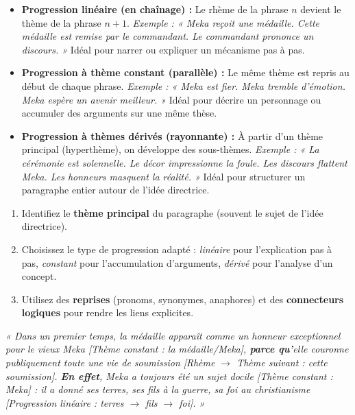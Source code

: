 \documentclass[11pt]{article}
\begin{document}
\begin{definition}
\begin{itemize}
\item \textbf{Progression linéaire (en chaînage) :} Le rhème de la phrase $n$ devient le thème de la phrase $n+1$. \emph{Exemple : « Meka reçoit une médaille. Cette médaille est remise par le commandant. Le commandant prononce un discours. »} Idéal pour narrer ou expliquer un mécanisme pas à pas.
\item \textbf{Progression à thème constant (parallèle) :} Le même thème est repris au début de chaque phrase. \emph{Exemple : « Meka est fier. Meka tremble d'émotion. Meka espère un avenir meilleur. »} Idéal pour décrire un personnage ou accumuler des arguments sur une même thèse.
\item \textbf{Progression à thèmes dérivés (rayonnante) :} À partir d'un thème principal (hyperthème), on développe des sous-thèmes. \emph{Exemple : « La cérémonie est solennelle. Le décor impressionne la foule. Les discours flattent Meka. Les honneurs masquent la réalité. »} Idéal pour structurer un paragraphe entier autour de l'idée directrice.
\end{itemize}
\end{definition}

\begin{methode}
\begin{enumerate}
\item Identifiez le \textbf{thème principal} du paragraphe (souvent le sujet de l'idée directrice).
\item Choisissez le type de progression adapté : \emph{linéaire} pour l'explication pas à pas, \emph{constant} pour l'accumulation d'arguments, \emph{dérivé} pour l'analyse d'un concept.
\item Utilisez des \textbf{reprises} (pronoms, synonymes, anaphores) et des \textbf{connecteurs logiques} pour rendre les liens explicites.
\end{enumerate}
\end{methode}

\begin{exemplebox}
\emph{« Dans un premier temps, la médaille apparaît comme un honneur exceptionnel pour le vieux Meka [Thème constant : la médaille/Meka], \textbf{parce qu'}elle couronne publiquement toute une vie de soumission [Rhème $\rightarrow$ Thème suivant : cette soumission]. \textbf{En effet}, Meka a toujours été un sujet docile [Thème constant : Meka] : il a donné ses terres, ses fils à la guerre, sa foi au christianisme [Progression linéaire : terres $\rightarrow$ fils $\rightarrow$ foi]. »}
\end{exemplebox}
\end{document}
